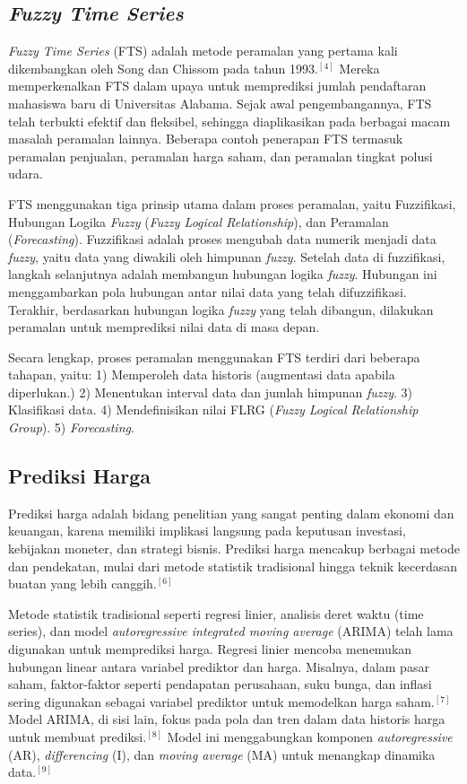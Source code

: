 \documentclass[conference]{IEEEtran}
\begin{document}
\subsection{\textit{Fuzzy Time Series}}
\textit{Fuzzy Time Series} (FTS) adalah metode peramalan yang pertama kali dikembangkan oleh Song dan Chissom pada tahun 1993.$^{[4]}$ Mereka memperkenalkan FTS dalam upaya untuk memprediksi jumlah pendaftaran mahasiswa baru di Universitas Alabama. Sejak awal pengembangannya, FTS telah terbukti efektif dan fleksibel, sehingga diaplikasikan pada berbagai macam masalah peramalan lainnya. Beberapa contoh penerapan FTS termasuk peramalan penjualan, peramalan harga saham, dan peramalan tingkat polusi udara.

FTS menggunakan tiga prinsip utama dalam proses peramalan, yaitu Fuzzifikasi, Hubungan Logika \textit{Fuzzy} (\textit{Fuzzy Logical Relationship}), dan Peramalan (\textit{Forecasting}). Fuzzifikasi adalah proses mengubah data numerik menjadi data \textit{fuzzy}, yaitu data yang diwakili oleh himpunan \textit{fuzzy}. Setelah data di fuzzifikasi, langkah selanjutnya adalah membangun hubungan logika \textit{fuzzy}. Hubungan ini menggambarkan pola hubungan antar nilai data yang telah difuzzifikasi. Terakhir, berdasarkan hubungan logika \textit{fuzzy} yang telah dibangun, dilakukan peramalan untuk memprediksi nilai data di masa depan.

Secara lengkap, proses peramalan menggunakan FTS terdiri dari beberapa tahapan, yaitu:
    1) Memperoleh data historis (augmentasi data apabila diperlukan.)
    2) Menentukan interval data dan jumlah himpunan \textit{fuzzy}.
    3) Klasifikasi data.
    4) Mendefinisikan nilai FLRG (\textit{Fuzzy Logical Relationship Group}).
    5) \textit{Forecasting}.
    

\subsection{Prediksi Harga}
Prediksi harga adalah bidang penelitian yang sangat penting dalam ekonomi dan keuangan, karena memiliki implikasi langsung pada keputusan investasi, kebijakan moneter, dan strategi bisnis. Prediksi harga mencakup berbagai metode dan pendekatan, mulai dari metode statistik tradisional hingga teknik kecerdasan buatan yang lebih canggih.$^{[6]}$

Metode statistik tradisional seperti regresi linier, analisis deret waktu (time series), dan model \textit{autoregressive integrated moving average} (ARIMA) telah lama digunakan untuk memprediksi harga. Regresi linier mencoba menemukan hubungan linear antara variabel prediktor dan harga. Misalnya, dalam pasar saham, faktor-faktor seperti pendapatan perusahaan, suku bunga, dan inflasi sering digunakan sebagai variabel prediktor untuk memodelkan harga saham.$^{[7]}$ Model ARIMA, di sisi lain, fokus pada pola dan tren dalam data historis harga untuk membuat prediksi.$^{[8]}$ Model ini menggabungkan komponen \textit{autoregressive} (AR), \textit{differencing} (I), dan \textit{moving average} (MA) untuk menangkap dinamika data.$^{[9]}$
\end{document}
